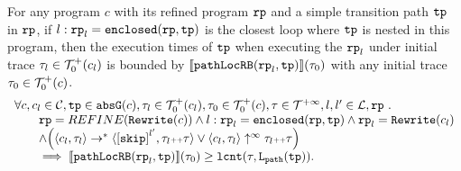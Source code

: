 \begin{lemma}
  For any program $c$ with its refined program $\mathtt{rp}$ and a simple transition path $\mathtt{tp}$ in $\mathtt{rp}$,
  if $l: \mathtt{rp}_l = \mathtt{enclosed}(\mathtt{rp}, \mathtt{tp})$ is the closest loop where $\mathtt{tp}$ is nested in this program,
  then the execution times of $\mathtt{tp}$ when executing the $\mathtt{rp}_l$ under initial trace $\mathtt{\tau}_l \in \mathcal{T}^{+}_0(c_l)$ is bounded by $\llbracket \mathtt{pathLocRB}(\mathtt{rp}_l, \mathtt{tp}) \rrbracket(\mathtt{\tau}_0)$ with any initial trace $\mathtt{\tau}_0 \in \mathcal{T}^{+}_0(c)$.
  \[
    \begin{array}{l}
    \forall c, c_l \in \cdom, \tpath \in \absG(c), 
    \trace_l \in \ftdom_0(c_l), \trace_0 \in \ftdom_0(c), \trace \in \tdom, l, l' \in \ldom, \rprog \sthat 
    \\ \qquad
    \rprog = REFINE(\algrewrite(c))
    \land
    l: \rprog_l = \kw{enclosed}(\rprog, \tpath)
    \land 
    \rprog_l = \algrewrite(c_l)
    \\ \qquad
    \land
    \Big(
    \config{c_l, \trace_l} \rightarrow^* \config{\clabel{\eskip}^{l'}, \trace_l \tracecat \trace}
    \lor \config{c_l, \trace_l} \uparrow^{\infty} \trace_l \tracecat \trace 
    \Big)
    \\ \qquad
    \implies
    \econfig{\outinB(\rprog_l, \tpath)}(\trace_0) \geq \lcounter(\trace, \pathl(\tpath)).
    \end{array}
  \]  
\end{lemma}
